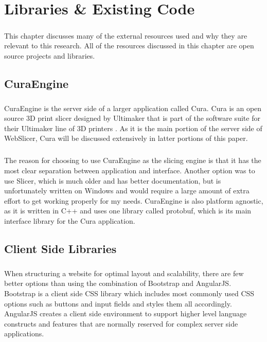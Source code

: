 \chapter{Libraries \& Existing Code}
\paragraph{}
This chapter discusses many of the external resources used and why they are relevant to this research. All of the resources discussed in this chapter are open source projects and libraries.

\section{CuraEngine}
\paragraph{}
CuraEngine is the server side of a larger application called Cura.
Cura is an open source 3D print slicer designed by Ultimaker that is part of the software suite for their Ultimaker line of 3D printers \citep{curaengine-2016}.
As it is the main portion of the server side of WebSlicer, Cura will be discussed extensively in latter portions of this paper.

\paragraph{}
The reason for choosing to use CuraEngine as the slicing engine is that it has the most clear separation between application and interface.
Another option was to use Slicer, which is much older and has better documentation, but is unfortunately written on Windows and would require a large amount of extra effort to get working properly for my needs.
CuraEngine is also platform agnostic, as it is written in C++ and uses one library called protobuf, which is its main interface library for the Cura application.

\section{Client Side Libraries}
\paragraph{}
When structuring a website for optimal layout and scalability, there are few better options than using the combination of Bootstrap and AngularJS.
Bootstrap is a client side CSS library which includes most commonly used CSS options such as buttons and input fields and styles them all accordingly.
AngularJS creates a client side environment to support higher level language constructs and features that are normally reserved for complex server side applications.

